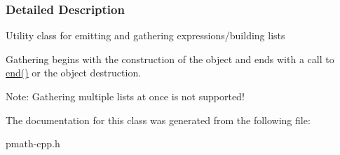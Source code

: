 \subsubsection{Detailed Description}
Utility class for emitting and gathering expressions/building lists

Gathering begins with the construction of the object and ends with a call to \hyperlink{classpmath_1_1_gather_d686bb5cc8ffc544bff3f7aaa3723061}{end()} or the object destruction. 

\begin{Desc}
\item[Note:]Gathering multiple lists at once is not supported! \end{Desc}


The documentation for this class was generated from the following file:\begin{CompactItemize}
\item 
pmath-cpp.h\end{CompactItemize}

